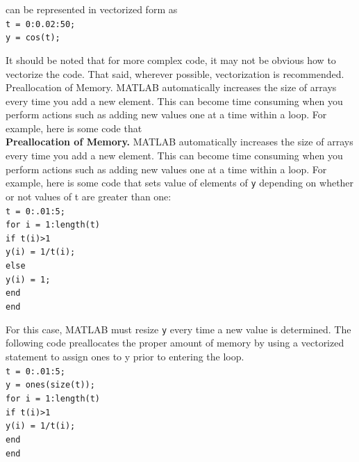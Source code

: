\documentclass[../main.tex]{subfiles}
\begin{document}
\noindent can be represented in vectorized form as\\

\texttt{t = 0:0.02:50;\\
\indent y = cos(t);\\}

\noindent It should be noted that for more complex code, it may not be obvious how to vectorize the code. That said, wherever possible, vectorization is recommended.
Preallocation of Memory. MATLAB automatically increases the size of arrays every time you add a new element. This can become time consuming when you perform actions such as adding new values one at a time within a loop. For example, here is some code that\\

\noindent\textbf{Preallocation of Memory.} MATLAB automatically increases the size of arrays every
time you add a new element. This can become time consuming when you perform actions
such as adding new values one at a time within a loop. For example, here is some code that
sets value of elements of \texttt{y} depending on whether or not values of t are greater than one:\\

\texttt{t = 0:.01:5;\\
\indent for i = 1:length(t)\\
\indent\hspace{2mm} if t(i)>1\\
\indent\hspace{4mm} y(i) = 1/t(i);\\
\indent\hspace{2mm} else\\
\indent\hspace{4mm} y(i) = 1;\\
\indent\hspace{2mm} end\\
\indent end\\}

\noindent For this case, MATLAB must resize \texttt{y} every time a new value is determined. The following
code preallocates the proper amount of memory by using a vectorized statement to
assign ones to y prior to entering the loop.\\

\texttt{t = 0:.01:5;\\
\indent y = ones(size(t));\\
\indent for i = 1:length(t)\\
\indent\hspace{2mm} if t(i)>1\\
\indent\hspace{4mm} y(i) = 1/t(i);\\
\indent\hspace{2mm} end\\
\indent end}\\
\end{document}
